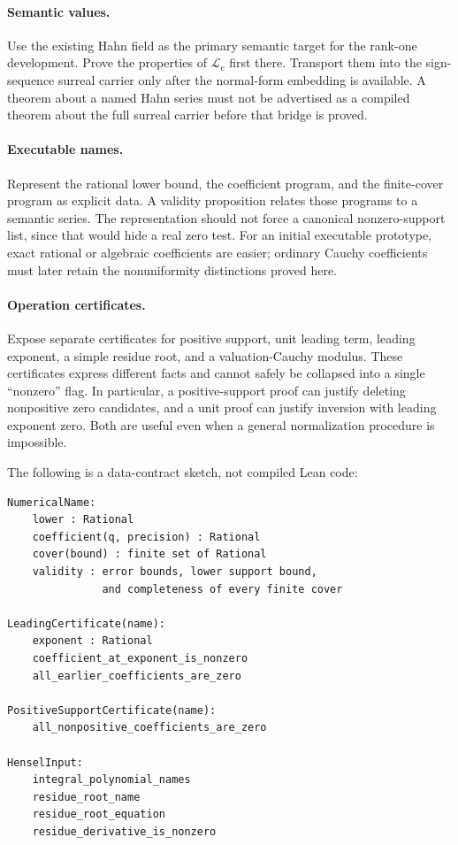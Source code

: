 \documentclass[11pt,letterpaper]{article}
\numberwithin{equation}{section}
\theoremstyle{definition}
\theoremstyle{remark}
\newcommand{\Lc}{\mathcal L_{\mathrm c}}
\begin{document}
\paragraph{Semantic values.}
Use the existing Hahn field as the primary semantic target for the
rank-one development. Prove the properties of $\Lc$ first there. Transport
them into the sign-sequence surreal carrier only after the normal-form
embedding is available. A theorem about a named Hahn series must not be
advertised as a compiled theorem about the full surreal carrier before
that bridge is proved.

\paragraph{Executable names.}
Represent the rational lower bound, the coefficient program, and the
finite-cover program as explicit data. A validity proposition relates those
programs to a semantic series. The representation should not force a
canonical nonzero-support list, since that would hide a real zero test.
For an initial executable prototype, exact rational or algebraic
coefficients are easier; ordinary Cauchy coefficients must later retain
the nonuniformity distinctions proved here.

\paragraph{Operation certificates.}
Expose separate certificates for positive support, unit leading term,
leading exponent, a simple residue root, and a valuation-Cauchy modulus.
These certificates express different facts and cannot safely be collapsed
into a single ``nonzero'' flag. In particular, a positive-support proof can
justify deleting nonpositive zero candidates, and a unit proof can justify
inversion with leading exponent zero. Both are useful even when a general
normalization procedure is impossible.

The following is a data-contract sketch, not compiled Lean code:
\par\noindent\begin{minipage}{\linewidth}
\begin{lstlisting}
NumericalName:
    lower : Rational
    coefficient(q, precision) : Rational
    cover(bound) : finite set of Rational
    validity : error bounds, lower support bound,
               and completeness of every finite cover

LeadingCertificate(name):
    exponent : Rational
    coefficient_at_exponent_is_nonzero
    all_earlier_coefficients_are_zero

PositiveSupportCertificate(name):
    all_nonpositive_coefficients_are_zero

HenselInput:
    integral_polynomial_names
    residue_root_name
    residue_root_equation
    residue_derivative_is_nonzero
\end{lstlisting}
\end{minipage}\par
\end{document}
